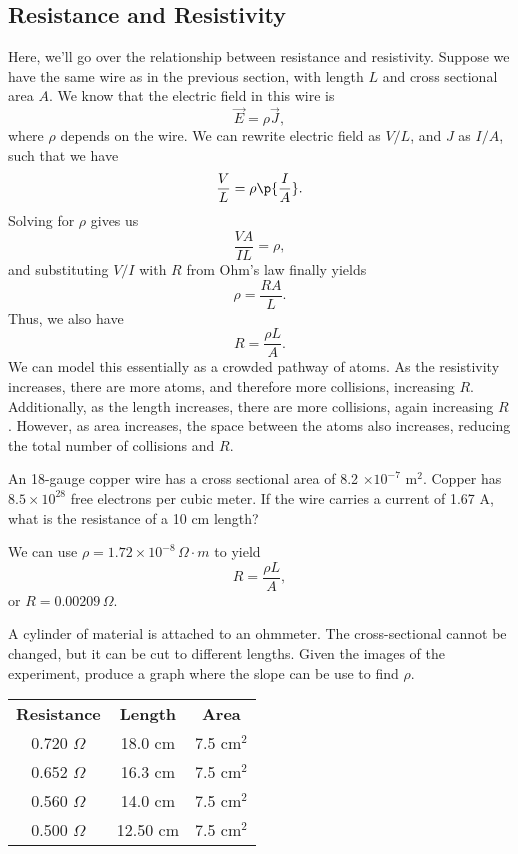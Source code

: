 \documentclass[11pt]{article}
\begin{document}
\subsection{Resistance and Resistivity}
Here, we'll go over the relationship between resistance and resistivity. Suppose we have the same wire as in the previous section, with length $L$ and cross sectional area $A$. We know that the electric field in this wire is
\[\vec{E} = \rho\vec{J},\]
where $\rho$ depends on the wire. We can rewrite electric field as $V/L$, and $J$ as $I/A$, such that we have
\[\frac{V}{L} = \rho\p{\frac{I}{A}}.\]
Solving for $\rho$ gives us
\[\frac{VA}{IL} = \rho,\]
and substituting $V/I$ with $R$ from Ohm's law finally yields
\begin{equation}
    \rho = \frac{RA}{L}.
\end{equation}
Thus, we also have
\begin{equation}
    R = \frac{\rho L}{A}.
\end{equation}
We can model this essentially as a crowded pathway of atoms. As the resistivity increases, there are more atoms, and therefore more collisions, increasing $R$. Additionally, as the length increases, there are more collisions, again increasing $R$. However, as area increases, the space between the atoms also increases, reducing the total number of collisions and $R$.
\begin{example}
    An 18-gauge copper wire has a cross sectional area of 8.2 $\times 10^{-7}$ m$^2$. Copper has $8.5 \times 10^{28}$ free electrons per cubic meter. If the wire carries a current of 1.67 A, what is the resistance of a 10 cm length?
\end{example}
\begin{solution}
    We can use $\rho = 1.72\times 10^{-8}\,\Omega\cdot m$ to yield
    \[R = \frac{\rho L}{A},\]
    or $R = 0.00209\,\Omega$.
\end{solution}
\begin{example}
    A cylinder of material is attached to an ohmmeter. The cross-sectional cannot be changed, but it can be cut to different lengths. Given the images of the experiment, produce a graph where the slope can be use to find $\rho$.    
\end{example}
\begin{table}
    \centering
    \begin{tabular}{ccc}
        \toprule
        \textbf{Resistance} & \textbf{Length} & \textbf{Area} \\
        0.720 $\Omega$ & 18.0 cm & 7.5 cm$^2$ \\
        0.652 $\Omega$ & 16.3 cm & 7.5 cm$^2$ \\
        0.560 $\Omega$ & 14.0 cm & 7.5 cm$^2$ \\
        0.500 $\Omega$ & 12.50 cm & 7.5 cm$^2$ \\ \bottomrule
    \end{tabular}    
\end{table}
\end{document}
